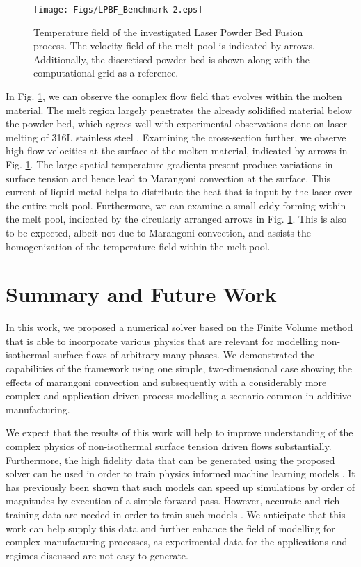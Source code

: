 \documentclass[conference,final,a4paper]{IEEEtran}
\begin{document}
\begin{figure}[!t]
  \centering
  \texttt{[image: Figs/LPBF\_Benchmark-2.eps]}
  \caption{Temperature field of the investigated Laser Powder Bed Fusion process. The velocity field of the melt pool is indicated by arrows. Additionally, the discretised powder bed is shown along with the computational grid as a reference.}
  \label{fig:lpbf-benchmark}
\end{figure}

In Fig. \ref{fig:lpbf-benchmark}, we can observe the complex flow field that evolves within the molten material. The melt region largely penetrates the already solidified material below the powder bed, which agrees well with experimental observations done on laser melting of 316L stainless steel \cite{mohrInSituDefectDetection2020}.
Examining the cross-section further, we observe high flow velocities at the surface of the molten material, indicated by arrows in Fig. \ref{fig:lpbf-benchmark}. The large spatial temperature gradients present produce variations in surface tension and hence lead to Marangoni convection at the surface. This current of liquid metal helps to distribute the heat that is input by the laser over the entire melt pool.
Furthermore, we can examine a small eddy forming within the melt pool, indicated by the circularly arranged arrows in Fig. \ref{fig:lpbf-benchmark}. This is also to be expected, albeit not due to Marangoni convection, and assists the homogenization of the temperature field within the melt pool.

\section{Summary and Future Work}

In this work, we proposed a numerical solver based on the Finite Volume method that is able to incorporate various physics that are relevant for modelling non-isothermal surface flows of arbitrary many phases. We demonstrated the capabilities of the framework using one simple, two-dimensional case showing the effects of marangoni convection and subsequently with a considerably more complex and application-driven process modelling a scenario common in additive manufacturing.

We expect that the results of this work will help to improve understanding of the complex physics of non-isothermal surface tension driven flows substantially. Furthermore, the high fidelity data that can be generated using the proposed solver can be used in order to train physics informed machine learning models \cite{karniadakisPhysicsinformedMachineLearning2021}. It has previously been shown that such models can speed up simulations by order of magnitudes by execution of a simple forward pass. However, accurate and rich training data are needed in order to train such models \cite{liFourierNeuralOperator2021,luDeepONetLearningNonlinear2020}. We anticipate that this work can help supply this data and further enhance the field of modelling for complex manufacturing processes, as experimental data for the applications and regimes discussed are not easy to generate.
\end{document}
